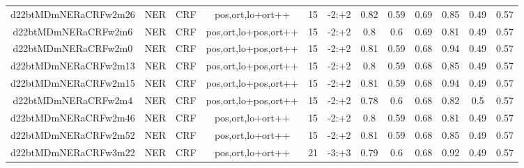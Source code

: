 \documentclass[a4paper]{article}
\begin{document}
\begin{landscape}
\begin{center}
\begin{tabular}{ |c|c|c|c|c|c|c|c|c|c|c|c|}
 
 	
 	\small{ d22btMDmNERaCRFw2m26 } & \small{ NER} & \small{  CRF }  & pos,ort,lo+ort++  &  15 &  \small{  -2:+2 }  &  0.82 & 0.59 & 0.69  &  0.85 & 0.49 & 0.57 \\
 	

 
 	
 	\small{ d22btMDmNERaCRFw2m6 } & \small{ NER} & \small{  CRF }  & pos,ort,lo+pos,ort++  &  15 &  \small{  -2:+2 }  &  0.8 & 0.6 & 0.69  &  0.81 & 0.49 & 0.57 \\
 	

 
 	
 	\small{ d22btMDmNERaCRFw2m0 } & \small{ NER} & \small{  CRF }  & pos,ort,lo+pos,ort++  &  15 &  \small{  -2:+2 }  &  0.81 & 0.59 & 0.68  &  0.94 & 0.49 & 0.57 \\
 	

 
 	
 	\small{ d22btMDmNERaCRFw2m13 } & \small{ NER} & \small{  CRF }  & pos,ort,lo+pos,ort++  &  15 &  \small{  -2:+2 }  &  0.8 & 0.59 & 0.68  &  0.85 & 0.49 & 0.57 \\
 	

 
 	
 	\small{ d22btMDmNERaCRFw2m15 } & \small{ NER} & \small{  CRF }  & pos,ort,lo+pos,ort++  &  15 &  \small{  -2:+2 }  &  0.81 & 0.59 & 0.68  &  0.94 & 0.49 & 0.57 \\
 	

 
 	
 	\small{ d22btMDmNERaCRFw2m4 } & \small{ NER} & \small{  CRF }  & pos,ort,lo+pos,ort++  &  15 &  \small{  -2:+2 }  &  0.78 & 0.6 & 0.68  &  0.82 & 0.5 & 0.57 \\
 	

 
 	
 	\small{ d22btMDmNERaCRFw2m46 } & \small{ NER} & \small{  CRF }  & pos,ort,lo+ort++  &  15 &  \small{  -2:+2 }  &  0.8 & 0.59 & 0.68  &  0.81 & 0.49 & 0.57 \\
 	

 
 	
 	\small{ d22btMDmNERaCRFw2m52 } & \small{ NER} & \small{  CRF }  & pos,ort,lo+ort++  &  15 &  \small{  -2:+2 }  &  0.81 & 0.59 & 0.68  &  0.85 & 0.49 & 0.57 \\
 	

 
 	
 	\small{ d22btMDmNERaCRFw3m22 } & \small{ NER} & \small{  CRF }  & pos,ort,lo+ort++  &  21 &  \small{  -3:+3 }  &  0.79 & 0.6 & 0.68  &  0.92 & 0.49 & 0.57 \\
 	


\end{tabular}
\end{center}
\end{landscape}
\end{document}
